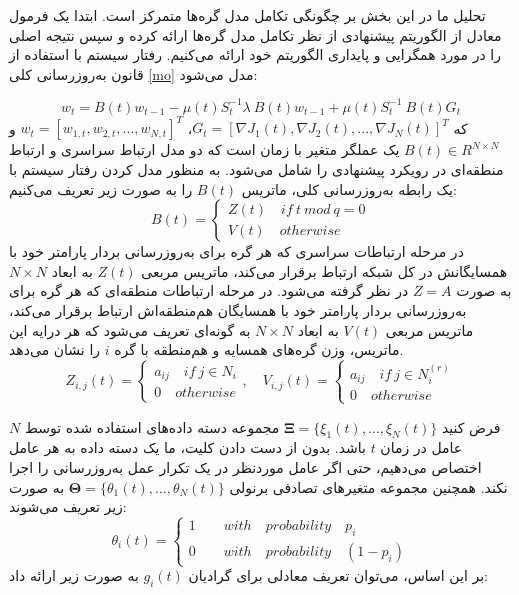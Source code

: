 تحلیل ما در این بخش بر چگونگی تکامل مدل‌ گره‌ها متمرکز است. ابتدا یک فرمول معادل از الگوریتم پیشنهادی از نظر تکامل مدل‌ گره‌ها ارائه کرده و سپس نتیجه اصلی را در مورد همگرایی و پایداری الگوریتم خود ارائه می‌کنیم. رفتار سیستم با استفاده از قانون به‌روزرسانی کلی \ref{mo} مدل می‌شود:	

\begin{equation}\label{mo}
	w_t=B(t) w_{t-1}-\mu(t) S_t^{-1}\lambda\ B(t) w_{t-1} +\mu(t)S_t^{-1}\ B(t) G_t
\end{equation}
که $G_t=[\nabla J_1(t), \nabla J_2(t), ..., \nabla J_N(t)]^T$،   $w_t=[w_{1,t},w_{2,t}, ..., w_{N,t}]^T$ و    $B(t)\in R^{N\times N}$ یک عملگر متغیر با زمان است که دو مدل ارتباط سراسری و ارتباط منطقه‌ای در رویکرد پیشنهادی را شامل می‌شود. به منظور مدل کردن رفتار سیستم با یک رابطه به‌روزرسانی کلی، ماتریس $B(t)$ را به صورت زیر تعریف می‌کنیم:
\begin{equation}\label{Bmarix}
	B(t)=
	\begin{cases}
		Z(t)\quad if\ t\ mod \ q=0\\
		V(t)\quad otherwise
	\end{cases}
\end{equation}
در مرحله ارتباطات سراسری که هر گره برای به‌روزرسانی بردار پارامتر خود با همسایگانش در کل شبکه ارتباط برقرار می‌کند، ماتریس مربعی $Z(t)$ به ابعاد $N\times N$ به صورت $Z=A$ در نظر گرفته می‌شود. در مرحله ارتباطات منطقه‌ای که هر گره برای به‌روزرسانی بردار پارامتر خود با همسایگان هم‌منطقه‌اش ارتباط برقرار می‌کند، ماتریس مربعی $V(t)$ به ابعاد $N\times N$ به گونه‌ای تعریف می‌شود که هر درایه این ماتریس، وزن گره‌های همسایه و هم‌منطقه با گره  $i$ را نشان می‌دهد. 
\begin{equation}\label{Nt}
	Z_{i,j}(t)=
	\begin{cases}
		a_{ij}\quad if\ j\in N_i\\
		0 \quad otherwise
	\end{cases},\quad
	V_{i,j}(t)=
	\begin{cases}
		a_{ij}\quad if\ j\in N_i^{(r)}\\
		0 \quad otherwise
	\end{cases}
\end{equation}

فرض کنید $\boldsymbol{\Xi}=\{\xi_1{(t)},...,\xi_N{(t)}\}$ مجموعه دسته داده‌های استفاده شده توسط $N$ عامل در زمان $t$ باشد. بدون از دست دادن کلیت، ما یک دسته داده  به هر عامل اختصاص می‌دهیم، حتی اگر عامل موردنظر در یک تکرار عمل به‌روزرسانی را اجرا نکند. همچنین مجموعه متغیرهای تصادفی برنولی $\boldsymbol{\Theta}=\{\theta_1(t),...,\theta_N(t)\}$ به صورت زیر تعریف می‌شوند: 
\begin{equation}\label{eTheta}
	\theta_i(t)=
	\begin{cases}
		1\qquad with\quad probability\quad p_i\\
		0\qquad with\quad probability\quad (1-p_i)
	\end{cases}
\end{equation}
بر این اساس، می‌توان تعریف معادلی برای گرادیان $g_i(t)$ به صورت زیر ارائه داد: 


